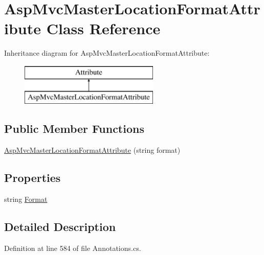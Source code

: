 \hypertarget{class_asp_mvc_master_location_format_attribute}{}\section{Asp\+Mvc\+Master\+Location\+Format\+Attribute Class Reference}
\label{class_asp_mvc_master_location_format_attribute}
Inheritance diagram for Asp\+Mvc\+Master\+Location\+Format\+Attribute\+:\begin{figure}[H]
\begin{center}
\leavevmode
\includegraphics[height=2.000000cm]{class_asp_mvc_master_location_format_attribute}
\end{center}
\end{figure}
\subsection*{Public Member Functions}
\begin{DoxyCompactItemize}
\item 
\hyperlink{class_asp_mvc_master_location_format_attribute_ac71ce5737a8427494201b92935523fd9}{Asp\+Mvc\+Master\+Location\+Format\+Attribute} (string format)
\end{DoxyCompactItemize}
\subsection*{Properties}
\begin{DoxyCompactItemize}
\item 
string \hyperlink{class_asp_mvc_master_location_format_attribute_a12e48477c571f14556915ebdef251912}{Format}
\end{DoxyCompactItemize}


\subsection{Detailed Description}


Definition at line 584 of file Annotations.\+cs.




